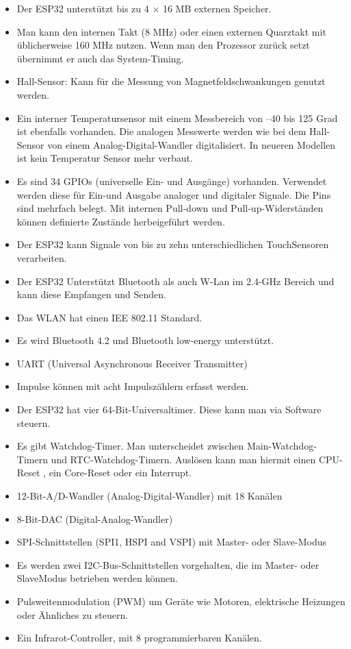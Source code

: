 \textbf{}
\begin{itemize}
    \item Der ESP32 unterstützt bis zu 4 × 16 MB externen Speicher.
    \item Man kann den internen Takt (8 MHz) oder einen
    externen Quarztakt mit üblicherweise 160 MHz nutzen. 
    Wenn man den Prozessor zurück setzt übernimmt er auch das System-Timing.
    \item Hall-Sensor: Kann für die Messung von Magnetfeldschwankungen genutzt werden.
    \item Ein interner Temperatursensor mit einem Messbereich von –40 bis 125 Grad ist ebenfalls vorhanden.
    Die analogen Messwerte werden wie bei dem Hall-Sensor
    von einem Analog-Digital-Wandler digitalisiert. 
    In neueren Modellen ist kein Temperatur Sensor mehr verbaut.
    \item Es sind 34 GPIOs (universelle Ein- und Ausgänge) vorhanden. 
    Verwendet werden diese für Ein-und Ausgabe analoger und digitaler Signale. 
    Die Pins sind mehrfach belegt. 
    Mit internen Pull-down und Pull-up-Widerständen können definierte Zustände herbeigeführt werden.
    \item Der ESP32 kann Signale von bis zu zehn unterschiedlichen TouchSensoren verarbeiten. 
    \item Der ESP32 Unterstützt Bluetooth als auch W-Lan im 2.4-GHz Bereich und kann diese 
    Empfangen und Senden. 
    \item Das WLAN hat einen IEE 802.11 Standard.
    \item Es wird Bluetooth 4.2 und Bluetooth low-energy unterstützt.
    \item UART (Universal Asynchronous Receiver Transmitter) 
    \item Impulse können mit acht Impulszählern erfasst werden. 
    \item Der ESP32 hat vier 64-Bit-Universaltimer. Diese kann man via Software steuern.
    \item Es gibt Watchdog-Timer. Man unterscheidet zwischen Main-Watchdog-Timern und RTC-Watchdog-Timern. 
    Auslösen kann man hiermit einen CPU-Reset , ein Core-Reset oder ein Interrupt.
    \item  12-Bit-A/D-Wandler (Analog-Digital-Wandler) mit 18 Kanälen 
    \item  8-Bit-DAC (Digital-Analog-Wandler)
    \item SPI-Schnittstellen (SPI1, HSPI and VSPI) mit Master- oder Slave-Modus
    \item Es werden zwei I2C-Bus-Schnittstellen vorgehalten, die im Master- oder SlaveModus betrieben werden können.
    \item Pulsweitenmodulation (PWM) um Geräte wie Motoren, elektrische Heizungen oder Ähnliches zu steuern. 
    \item Ein Infrarot-Controller, mit 8 programmierbaren Kanälen.
    
\end{itemize}

